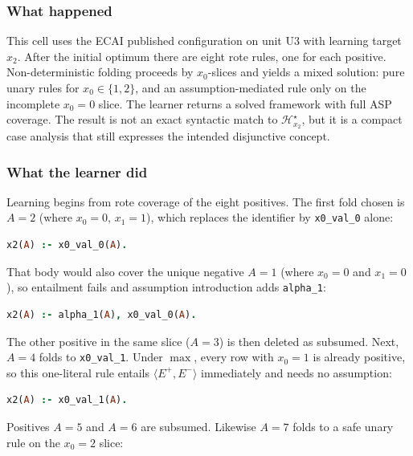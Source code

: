 \documentclass[11pt]{article}
\begin{document}
\subsubsection{What happened}

This cell uses the ECAI published configuration on unit U3 with learning target \(x_2\). After the initial optimum there are eight rote rules, one for each positive. Non-deterministic folding proceeds by \(x_0\)-slices and yields a mixed solution: pure unary rules for \(x_0\in\{1,2\}\), and an assumption-mediated rule only on the incomplete \(x_0=0\) slice. The learner returns a solved framework with full ASP coverage. The result is not an exact syntactic match to \(\mathcal{H}_{x_2}^\star\), but it is a compact case analysis that still expresses the intended disjunctive concept.

\subsubsection{What the learner did}

Learning begins from rote coverage of the eight positives. The first fold chosen is \(A=2\) (where \(x_0=0\), \(x_1=1\)), which replaces the identifier by \texttt{x0\_val\_0} alone:

\begin{lstlisting}[style=logic,language=Prolog]
x2(A) :- x0_val_0(A).
\end{lstlisting}

That body would also cover the unique negative \(A=1\) (where \(x_0=0\) and \(x_1=0\)), so entailment fails and assumption introduction adds \texttt{alpha\_1}:

\begin{lstlisting}[style=logic,language=Prolog]
x2(A) :- alpha_1(A), x0_val_0(A).
\end{lstlisting}

The other positive in the same slice (\(A=3\)) is then deleted as subsumed. Next, \(A=4\) folds to \texttt{x0\_val\_1}. Under \(\max\), every row with \(x_0=1\) is already positive, so this one-literal rule entails \(\langle E^+,E^-\rangle\) immediately and needs no assumption:

\begin{lstlisting}[style=logic,language=Prolog]
x2(A) :- x0_val_1(A).
\end{lstlisting}

Positives \(A=5\) and \(A=6\) are subsumed. Likewise \(A=7\) folds to a safe unary rule on the \(x_0=2\) slice:
\end{document}
